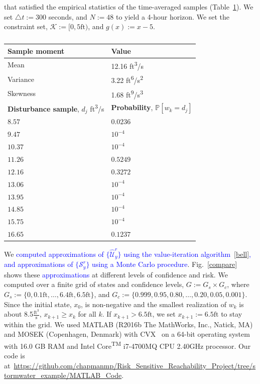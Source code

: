 \documentclass[letterpaper, 10 pt, conference]{ieeeconf}  %
\begin{document}
that satisfied the empirical statistics of the time-averaged samples (Table~\ref{dist}). 
We set $\triangle t := 300$ seconds, and $N := 48$ to yield a 4-hour horizon.
We set the constraint set, $\mathcal{K} := [0, 5\text{ft})$, and $g(x) := x - 5$.
%
\begin{table}
\begin{center}
\caption{}
\begin{tabular}{| p{3.5cm} | p{3.5cm} |}
\hline
\bf{Sample moment} & \bf{Value}  \\ \hline
Mean & 12.16 ft\textsuperscript{3}/s \\ 
Variance & 3.22 ft\textsuperscript{6}/s\textsuperscript{2} \\ 
Skewness & 1.68 ft\textsuperscript{9}/s\textsuperscript{3} \\ 
\hline 
\textbf{Disturbance sample}, $d_j$ ft\textsuperscript{3}/s & \textbf{Probability}, $\mathbb{P}[w_k = d_j]$ \\ \hline
$8.57$ 		& $0.0236$ \\
$9.47$ 		& $10^{-4}$ \\
$10.37$ 		& $10^{-4}$ \\
$11.26$  & $0.5249$ \\ 
$12.16$ & $0.3272$ \\ 
$13.06$  & $10^{-4}$ \\ 
$13.95$  & $10^{-4}$ \\ 
$14.85$  & $10^{-4}$ \\ 
$15.75$  & $10^{-4}$ \\ 
$16.65$  & $0.1237$ \\ \hline
\end{tabular}
\begin{flushleft} \end{flushleft}
\label{dist}
\end{center}
\end{table}
%

We \textcolor{blue}{computed approximations of $\{\widehat{\mathcal{U}}_y^r\}$ using the value-iteration algorithm~\eqref{bell},
and approximations of $\{\mathcal{S}_y^r\}$ using a Monte Carlo procedure}.
Fig.~\ref{compare} shows these \textcolor{blue}{approximations} at different levels of confidence and risk.
We computed over a finite grid of states and confidence levels, $G := G_s \times G_c$, where  
$G_s := \{0, 0.1\text{ft}, \dots, 6.4\text{ft}, 6.5\text{ft}\}$,
and $G_c := \{0.999, 0.95, 0.80, \dots, 0.20, 0.05, 0.001\}$.
Since the initial state, $x_0$, is non-negative and the smallest realization of $w_k$ is about 8.5$\frac{\text{ft}^3}{\text{s}}$, 
$x_{k+1}\geq x_k$ for all $k$. 
If $x_{k+1} > 6.5\text{ft}$, we set $x_{k+1} := 6.5\text{ft}$ to stay within the grid.
We used MATLAB (R2016b The MathWorks, Inc., Natick, MA) and MOSEK (Copenhagen, Denmark) with CVX~\cite{grant2008cvx} on a
64-bit operating system with 16.0 GB RAM and Intel\textsuperscript{\textregistered} Core\textsuperscript{TM} i7-4700MQ CPU \@ 2.40GHz processor.
Our code is at~\url{https://github.com/chapmanmp/Risk_Sensitive_Reachability_Project/tree/stormwater_example/MATLAB_Code}.
\end{document}
